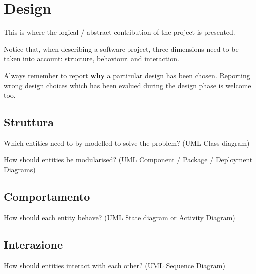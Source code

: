\section{Design}

This is where the logical / abstract contribution of the project is presented.

Notice that, when describing a software project, three dimensions need to be taken into account: structure, behaviour, and interaction.

Always remember to report \textbf{why} a particular design has been chosen.
Reporting wrong design choices which has been evalued during the design phase is welcome too.

\subsection{Struttura}

Which entities need to by modelled to solve the problem?
%
(UML Class diagram)

How should entities be modularised?
%
(UML Component / Package / Deployment Diagrams)

\subsection{Comportamento}

How should each entity behave?
%
(UML State diagram or Activity Diagram)

\subsection{Interazione}

How should entities interact with each other?
%
(UML Sequence Diagram)
